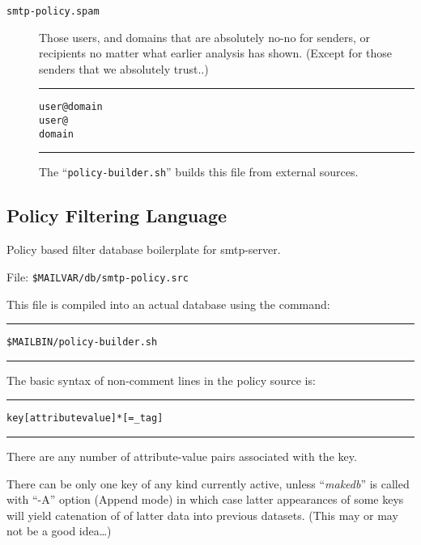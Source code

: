 \begin{description}
\item[\tt smtp-policy.spam] \mbox{}

Those users, and domains that are absolutely no-no for senders,
or recipients no matter what earlier analysis has shown.
(Except for those senders that we absolutely trust..)

\begin{alltt}\medskip\hrule\medskip
 user@domain
 user@
 domain
\medskip\hrule\end{alltt}\medskip

The ``{\tt policy-builder.sh}'' builds this file from external sources. 

\end{description}




\subsection{Policy Filtering Language}
\label{ref:smtp_policy_filtering}


Policy based filter database boilerplate for smtp-server.

File:  {\tt \$MAILVAR/db/smtp-policy.src}

This file is compiled into an actual database using the command:
\begin{alltt}\medskip\hrule\medskip
  \$MAILBIN/policy-builder.sh
\medskip\hrule
\end{alltt}\par


The basic syntax of non-comment lines in the policy source is:
\begin{alltt}\medskip\hrule\medskip
  key  [attribute value]* [= \_tag]
\medskip\hrule
\end{alltt}\par

There are any number of attribute-value pairs associated with the key.

There can be only one key of any kind currently active, unless ``{\em makedb}''
is called with ``-A'' option (Append mode) in which case latter appearances
of some keys will yield catenation of of latter data into previous datasets.
(This may or may not be a good idea\ldots)

